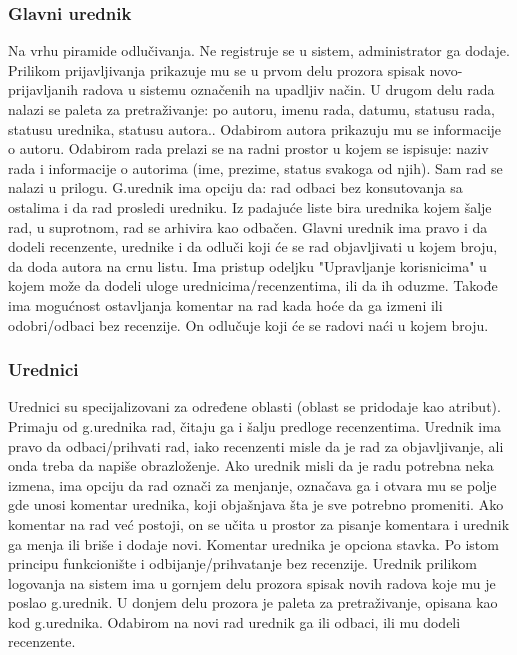 \documentclass[a4paper]{article}
\begin{document}
    \subsubsection{Glavni urednik}
    Na vrhu piramide odlučivanja. Ne registruje se u sistem, administrator ga dodaje. Prilikom prijavljivanja prikazuje mu se u prvom delu prozora spisak novo-prijavljanih radova u sistemu označenih na upadljiv način. U drugom delu rada nalazi se paleta za pretraživanje: po autoru, imenu rada, datumu, statusu rada, statusu urednika, statusu autora.. Odabirom autora prikazuju mu se informacije o autoru. Odabirom rada prelazi se na radni prostor u kojem se ispisuje: naziv rada i informacije o autorima (ime, prezime, status svakoga od njih). Sam rad se nalazi u prilogu. G.urednik ima opciju da: rad odbaci bez konsutovanja sa ostalima i da rad prosledi uredniku. Iz padajuće liste bira urednika kojem šalje rad, u suprotnom, rad se arhivira kao odbačen. Glavni urednik ima pravo i da dodeli recenzente, urednike i da odluči koji će se rad objavljivati u kojem broju, da doda autora na crnu listu. Ima pristup odeljku "Upravljanje korisnicima" u kojem može da dodeli uloge urednicima/recenzentima, ili da ih oduzme. Takođe ima mogućnost ostavljanja komentar na rad kada hoće da ga izmeni ili odobri/odbaci bez recenzije. On odlučuje koji će se radovi naći u kojem broju.

    \subsubsection{Urednici}
    Urednici su specijalizovani za određene oblasti (oblast se pridodaje kao atribut). Primaju od g.urednika rad, čitaju ga i šalju predloge recenzentima. Urednik ima pravo da odbaci/prihvati rad, iako recenzenti misle da je rad za objavljivanje, ali onda treba da napiše obrazloženje. Ako urednik misli da je radu potrebna neka izmena, ima opciju da rad označi za menjanje, označava ga i otvara mu se polje gde unosi komentar urednika, koji objašnjava šta je sve potrebno promeniti. Ako komentar  na rad već postoji, on se učita u prostor za pisanje komentara i urednik ga menja ili briše i dodaje novi. Komentar urednika je opciona stavka. Po istom principu funkcionište i odbijanje/prihvatanje bez recenzije. Urednik prilikom logovanja na sistem ima u gornjem delu prozora spisak novih radova koje mu je poslao g.urednik. U donjem delu prozora je paleta za pretraživanje, opisana kao kod g.urednika. Odabirom na novi rad urednik ga ili odbaci, ili mu dodeli recenzente.
\end{document}
